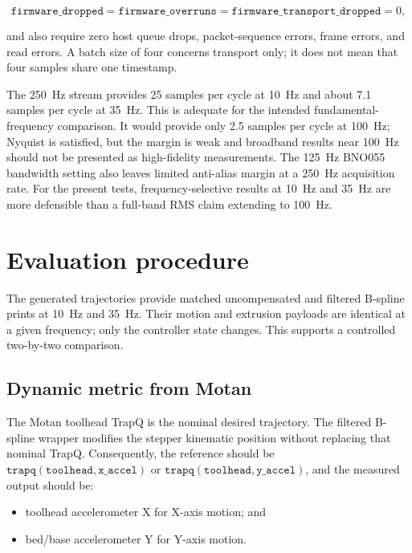 \documentclass[11pt,a4paper]{article}
\begin{document}
\begin{equation}
    \mathtt{firmware\_dropped}=
    \mathtt{firmware\_overruns}=
    \mathtt{firmware\_transport\_dropped}=0,
\end{equation}

and also require zero host queue drops, packet-sequence errors, frame errors,
and read errors.  A batch size of four concerns transport only; it does not
mean that four samples share one timestamp.

The \SI{250}{Hz} stream provides 25 samples per cycle at \SI{10}{Hz} and about
7.1 samples per cycle at \SI{35}{Hz}.  This is adequate for the intended
fundamental-frequency comparison.  It would provide only 2.5 samples per cycle
at \SI{100}{Hz}; Nyquist is satisfied, but the margin is weak and broadband
results near \SI{100}{Hz} should not be presented as high-fidelity
measurements.  The \SI{125}{Hz} BNO055 bandwidth setting also leaves limited
anti-alias margin at a \SI{250}{Hz} acquisition rate.  For the present tests,
frequency-selective results at \SI{10}{Hz} and \SI{35}{Hz} are more defensible
than a full-band RMS claim extending to \SI{100}{Hz}.

\section{Evaluation procedure}

The generated trajectories provide matched uncompensated and filtered
B-spline prints at \SI{10}{Hz} and \SI{35}{Hz}.  Their motion and extrusion
payloads are identical at a given frequency; only the controller state changes.
This supports a controlled two-by-two comparison.

\subsection{Dynamic metric from Motan}

The Motan toolhead TrapQ is the nominal desired trajectory.  The filtered
B-spline wrapper modifies the stepper kinematic position without replacing
that nominal TrapQ.  Consequently, the reference should be
\(\mathtt{trapq(toolhead,x\_accel)}\) or
\(\mathtt{trapq(toolhead,y\_accel)}\), and the measured output should be:

\begin{itemize}
    \item toolhead accelerometer X for X-axis motion; and
    \item bed/base accelerometer Y for Y-axis motion.
\end{itemize}
\end{document}
